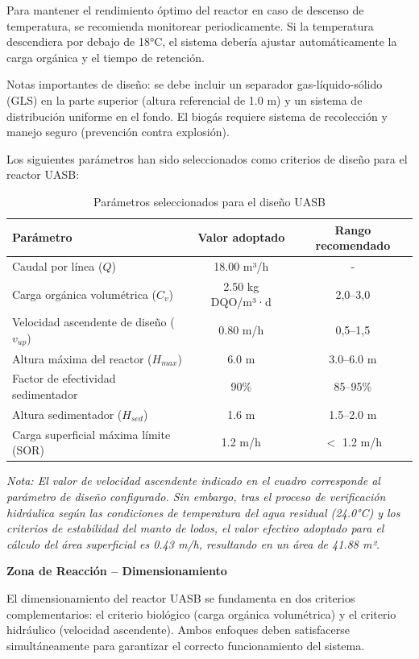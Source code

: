 Para mantener el rendimiento óptimo del reactor en caso de descenso de temperatura, se recomienda monitorear periodicamente. Si la temperatura descendiera por debajo de 18°C, el sistema debería ajustar automáticamente la carga orgánica y el tiempo de retención.

Notas importantes de diseño: se debe incluir un separador gas-líquido-sólido (GLS) en la parte superior (altura referencial de 1.0 m) y un sistema de distribución uniforme en el fondo. El biogás requiere sistema de recolección y manejo seguro (prevención contra explosión).

Los siguientes parámetros han sido seleccionados como criterios de diseño para el reactor UASB:

\begin{table}[H]
\centering
\caption{Parámetros seleccionados para el diseño UASB}
\begin{tabular}{p{6cm}cc}
\toprule
\textbf{Parámetro} & \textbf{Valor adoptado} & \textbf{Rango recomendado} \\
\midrule
Caudal por línea ($Q$) & 18.00 m³/h & - \\
Carga orgánica volumétrica ($C_v$) & 2.50 kg DQO/m³·d & 2,0--3,0 \\
Velocidad ascendente de diseño ($v_{up}$) & 0.80 m/h & 0,5--1,5 \\
Altura máxima del reactor ($H_{max}$) & 6.0 m & 3.0--6.0 m \\
Factor de efectividad sedimentador & 90\% & 85--95\% \\
Altura sedimentador ($H_{sed}$) & 1.6 m & 1.5--2.0 m \\
Carga superficial máxima límite (SOR) & 1.2 m/h & $<$ 1.2 m/h \\
\bottomrule
\end{tabular}
\end{table}

\textit{Nota: El valor de velocidad ascendente indicado en el cuadro corresponde al parámetro de diseño configurado. Sin embargo, tras el proceso de verificación hidráulica según las condiciones de temperatura del agua residual (24.0°C) y los criterios de estabilidad del manto de lodos, el valor efectivo adoptado para el cálculo del área superficial es 0.43 m/h, resultando en un área de 41.88 m².}

\textbf{Zona de Reacción -- Dimensionamiento}

El dimensionamiento del reactor UASB se fundamenta en dos criterios complementarios: el criterio biológico (carga orgánica volumétrica) y el criterio hidráulico (velocidad ascendente). Ambos enfoques deben satisfacerse simultáneamente para garantizar el correcto funcionamiento del sistema.

